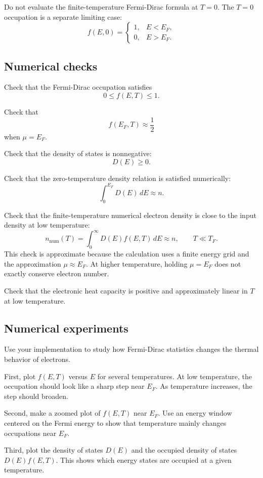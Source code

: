 Do not evaluate the finite-temperature Fermi-Dirac formula at \(T=0\). The \(T=0\) occupation is a separate limiting case:
\[
f(E,0)=
\begin{cases}
1, & E<E_F,\\
0, & E>E_F.
\end{cases}
\]

\subsection{Numerical checks}

Check that the Fermi-Dirac occupation satisfies
\[
0\le f(E,T)\le1.
\]

Check that
\[
f(E_F,T)\approx\frac12
\]
when \(\mu=E_F\).

Check that the density of states is nonnegative:
\[
D(E)\ge0.
\]

Check that the zero-temperature density relation is satisfied numerically:
\[
\int_0^{E_F}D(E)\,dE\approx n.
\]

Check that the finite-temperature numerical electron density is close to the input density at low temperature:
\[
n_{\mathrm{num}}(T)
=
\int_0^\infty D(E)f(E,T)\,dE
\approx
n,
\qquad
T\ll T_F.
\]
This check is approximate because the calculation uses a finite energy grid and the approximation \(\mu\approx E_F\). At higher temperature, holding \(\mu=E_F\) does not exactly conserve electron number.

Check that the electronic heat capacity is positive and approximately linear in \(T\) at low temperature.

\subsection{Numerical experiments}

Use your implementation to study how Fermi-Dirac statistics changes the thermal behavior of electrons.

First, plot \(f(E,T)\) versus \(E\) for several temperatures. At low temperature, the occupation should look like a sharp step near \(E_F\). As temperature increases, the step should broaden.

Second, make a zoomed plot of \(f(E,T)\) near \(E_F\). Use an energy window centered on the Fermi energy to show that temperature mainly changes occupations near \(E_F\).

Third, plot the density of states \(D(E)\) and the occupied density of states \(D(E)f(E,T)\). This shows which energy states are occupied at a given temperature.

